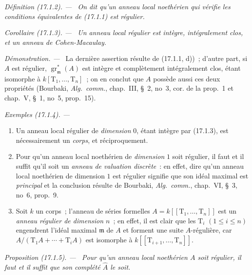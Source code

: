 \documentclass[10pt,oneside]{book}
\makeatletter
\newcommand{\setmanualcurrentlabel}[1]{\def\@currentlabel{#1}}
\newenvironment{definition}[1][]{%
  \setmanualcurrentlabel{#1}\par\medskip\noindent\itshape Définition (#1). ---\ }{\par}
\newenvironment{proposition}[1][]{%
  \setmanualcurrentlabel{#1}\par\medskip\noindent\itshape Proposition (#1). ---\ }{\par}
\newenvironment{corollary}[1][]{%
  \setmanualcurrentlabel{#1}\par\medskip\noindent\itshape Corollaire (#1). ---\ }{\par}
\newenvironment{examples}[1][]{%
  \setmanualcurrentlabel{#1}\par\medskip\noindent\textit{Exemples (#1). ---}\ }{\par}
\newenvironment{proof}{%
  \par\medskip\noindent\textit{Démonstration. ---\ }}{\par}
\makeatother
\begin{document}
\begin{definition}[17.1.2]
\label{0.17.1.2-fr}
On dit qu'un anneau local noethérien qui vérifie les conditions équivalentes de
(17.1.1) est \emph{régulier}.
\end{definition}

\begin{corollary}[17.1.3]
\label{0.17.1.3-fr}
Un anneau local régulier est intègre, intégralement clos, et un anneau de
Cohen-Macaulay.
\end{corollary}

\begin{proof}
La dernière assertion résulte de (17.1.1, d))~; d'autre part, si $A$ est
régulier, $\operatorname{gr}^*_{\mathfrak{m}}(A)$ est intègre et complètement
intégralement clos, étant isomorphe à $k[\mathrm{T}_1,\ldots,\mathrm{T}_n]$~;
on en conclut que $A$ possède aussi ces deux propriétés (Bourbaki,
\emph{Alg.~comm.}, chap.~III, \S~2, no~3, cor. de la prop.~1 et chap.~V,
\S~1, no~5, prop.~15).
\end{proof}

\begin{examples}[17.1.4]
\label{0.17.1.4-fr}
\begin{enumerate}
  \item[\rm (i)] Un anneau local régulier de \emph{dimension} $0$, étant
  intègre par (17.1.3), est nécessairement un \emph{corps}, et réciproquement.
  \item[\rm (ii)] Pour qu'un anneau local noethérien de \emph{dimension} $1$
  soit régulier, il faut et il suffit qu'il soit un \emph{anneau de valuation
  discrète}~: en effet, dire qu'un anneau local noethérien de dimension $1$ est
  régulier signifie que son idéal maximal est \emph{principal} et la conclusion
  résulte de Bourbaki, \emph{Alg.~comm.}, chap.~VI, \S~3, no~6, prop.~9.
  \item[\rm (iii)] Soit $k$ un corps~; l'anneau de séries formelles
  $A=k[[\mathrm{T}_1,\ldots,\mathrm{T}_n]]$ est un \emph{anneau régulier de
  dimension $n$}~; en effet, il est clair que les $\mathrm{T}_i$
  $(1\leq i\leq n)$ engendrent l'idéal maximal $\mathfrak{m}$ de $A$ et
  forment une suite $A$-régulière, car
  $A/(\mathrm{T}_1A+\cdots+\mathrm{T}_iA)$ est isomorphe à
  $k[[\mathrm{T}_{i+1},\ldots,\mathrm{T}_n]]$.
\end{enumerate}
\end{examples}

\begin{proposition}[17.1.5]
\label{0.17.1.5-fr}
Pour qu'un anneau local noethérien $A$ soit régulier, il faut et il suffit que
son complété $\widehat{A}$ le soit.
\end{proposition}
\end{document}

